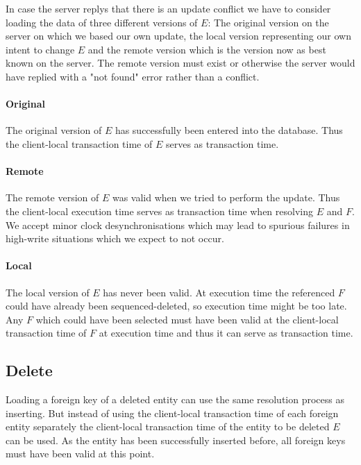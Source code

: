 \documentclass[a4paper]{memoir}
\begin{document}
In case the server replys that there is an update conflict we have to consider
loading the data of three different versions of $E$: The original version on the
server on which we based our own update, the local version representing our own
intent to change $E$ and the remote version which is the version now as best
known on the server. The remote version must exist or otherwise the server would
have replied with a "not found" error rather than a conflict.

\paragraph{Original}

The original version of $E$ has successfully been entered into the database.
Thus the client-local transaction time of $E$ serves as transaction time.

\paragraph{Remote}

The remote version of $E$ was valid when we tried to perform the update. Thus
the client-local execution time serves as transaction time when resolving $E$
and $F$. We accept minor clock desynchronisations which may lead to spurious
failures in high-write situations which we expect to not occur.

\paragraph{Local}

The local version of $E$ has never been valid. At execution time the referenced
$F$ could have already been sequenced-deleted, so execution time might be too
late. Any $F$ which could have been selected must have been valid at the
client-local transaction time of $F$ at execution time and thus it can serve as
transaction time.

\subsection{Delete}

Loading a foreign key of a deleted entity can use the same resolution process as
inserting. But instead of using the client-local transaction time of each
foreign entity separately the client-local transaction time of the entity to be
deleted $E$ can be used. As the entity has been successfully inserted before,
all foreign keys must have been valid at this point.
\end{document}
